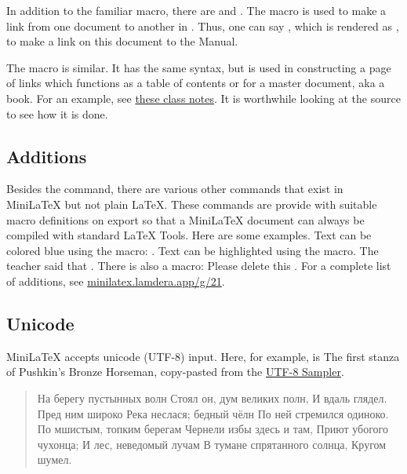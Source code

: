 In addition to the familiar  macro, there are   and .  The  macro
is used to make a link from one document to another in .   Thus, one can say
, which is rendered as , to make a link on this document to the Manual.

The  macro is similar.  It has the same syntax, but is used in constructing a page of links which functions as a table of contents or  for a master document, aka a book.  For an example, see \href{https://minilatex.lamdera.app/g/34}{these class notes}. It is worthwhile looking at the source to see how it is done.




\subsection{Additions}

Besides the  command, there are various other commands that exist in MiniLaTeX but not plain LaTeX.  These commands are provide with suitable macro definitions on export so that a MiniLaTeX document can always be compiled with standard LaTeX Tools.  Here are some examples.  Text can be colored blue using the  macro: .  Text can be highlighted using the  macro.  The teacher said that .
There is also a  macro: Please delete this .  For a complete list of additions, see \href{https://minilatex.lamdera.app/g/21}{minilatex.lamdera.app/g/21}.


\subsection{Unicode}

MiniLaTeX accepts unicode (UTF-8) input.  Here, for example, is The first stanza of Pushkin's Bronze Horseman, copy-pasted from the \href{http://www.columbia.edu/~fdc/utf8/}{UTF-8 Sampler}.


\begin{center}
\begin{verse}
На берегу пустынных волн
Стоял он, дум великих полн,
И вдаль глядел. Пред ним широко
Река неслася; бедный чёлн
По ней стремился одиноко.
По мшистым, топким берегам
Чернели избы здесь и там,
Приют убогого чухонца;
И лес, неведомый лучам
В тумане спрятанного солнца,
Кругом шумел.
\end{verse}
\end{center}

